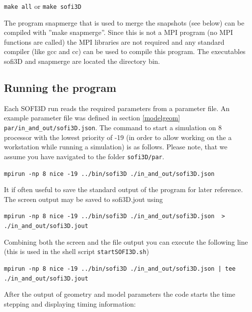 \documentclass[11pt,onecolumn,oneside]{article}
\begin{document}
 \lstinline{make all}
or
 \lstinline{make sofi3D}


The program snapmerge that is used to merge the snapshots (see below) can be compiled with ''make snapmerge''. Since this is not a MPI program (no MPI functions are called) the MPI libraries are not required and any standard compiler (like gcc and cc) can be used to compile this program. The executables sofi3D and snapmerge are located the directory bin.

\subsection{Running the program}\label{compexec1} 
Each SOFI3D run reads the required parameters from a parameter file. An example parameter file was defined in section \ref{modelgeom}  \lstinline{par/in_and_out/sofi3D.json}. 
The command to start a simulation on 8 processor with the lowest priority of -19 (in order to allow working on the a workstation while running a simulation) is as follows. Please note, that we assume you have navigated to the folder  \lstinline{sofi3D/par}.

 \lstinline{mpirun -np 8 nice -19 ../bin/sofi3D ./in_and_out/sofi3D.json }

It if often useful to save the standard output of the program for later reference. The screen output may be saved to sofi3D.jout using 

 \lstinline{mpirun -np 8 nice -19 ../bin/sofi3D ./in_and_out/sofi3D.json  >  ./in_and_out/sofi3D.jout}

Combining both the screen and the file output you can execute the following line (this is used in the shell script  \lstinline{startSOFI3D.sh})

 \lstinline{mpirun -np 8 nice -19 ../bin/sofi3D ./in_and_out/sofi3D.json | tee ./in_and_out/sofi3D.jout}

After the output of geometry and model parameters the code starts the time stepping and displaying timing information:
\end{document}
